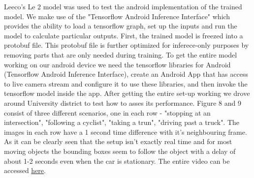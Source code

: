 \documentclass{article}
\begin{document}
Leeco's Le 2 model was used to test the android implementation of the trained model. We make use of the "Tensorflow Android Inference Interface" which provides the ability to load a tensorflow graph, set up the inputs and run the model to calculate particular outputs. First, the trained model is freezed into a protobuf file. This protobuf file is further optimized for inferece-only purposes by removing parts that are only needed during training. To get the entire model working on our android device we need the tensorflow libraries for Android (Tensorflow Android Inference Interface), create an Android App that has access to live camera stream and configure it to use these libraries, and then invoke the tensorflow model inside the app. After getting the entire set-up working we drove around University district to test how to asses its performance. Figure 8 and 9 consist of three different scenarios, one in each row - "stopping at an intersection", "following a cyclist", "taking a trun", "driving past a truck". The images in each row have a 1 second time difference with it's neighbouring frame. As it can be clearly seen that the setup isn't exactly real time and for most moving objects the bounding boxes seem to follow the object with a delay of about 1-2 seconds even when the car is stationary. The entire video can be accessed \href{https://drive.google.com/drive/folders/1nKVbr_vOX3ATzaXllUpJjq_BlYVBL-1D?usp=sharing}{here}.
\end{document}
